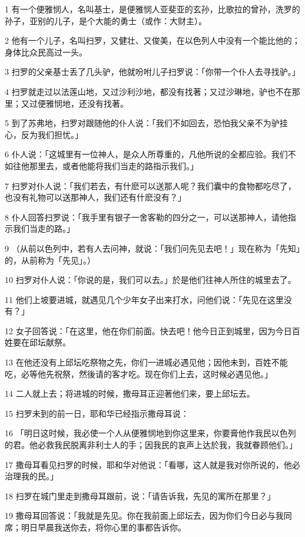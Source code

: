\par 1 有一个便雅悯人，名叫基士，是便雅悯人亚斐亚的玄孙，比歌拉的曾孙，洗罗的孙子，亚别的儿子，是个大能的勇士（或作：大财主）。
\par 2 他有一个儿子，名叫扫罗，又健壮、又俊美，在以色列人中没有一个能比他的；身体比众民高过一头。
\par 3 扫罗的父亲基士丢了几头驴，他就吩咐儿子扫罗说：「你带一个仆人去寻找驴。」
\par 4 扫罗就走过以法莲山地，又过沙利沙地，都没有找著；又过沙琳地，驴也不在那里；又过便雅悯地，还没有找著。
\par 5 到了苏弗地，扫罗对跟随他的仆人说：「我们不如回去，恐怕我父亲不为驴挂心，反为我们担忧。」
\par 6 仆人说：「这城里有一位神人，是众人所尊重的，凡他所说的全都应验。我们不如往他那里去，或者他能将我们当走的路指示我们。」
\par 7 扫罗对仆人说：「我们若去，有什麽可以送那人呢？我们囊中的食物都吃尽了，也没有礼物可以送那神人，我们还有什麽没有？」
\par 8 仆人回答扫罗说：「我手里有银子一舍客勒的四分之一，可以送那神人，请他指示我们当走的路。」
\par 9 （从前以色列中，若有人去问神，就说：「我们问先见去吧！」现在称为「先知」的，从前称为「先见」。）
\par 10 扫罗对仆人说：「你说的是，我们可以去。」於是他们往神人所住的城里去了。
\par 11 他们上坡要进城，就遇见几个少年女子出来打水，问他们说：「先见在这里没有？」
\par 12 女子回答说：「在这里，他在你们前面。快去吧！他今日正到城里，因为今日百姓要在邱坛献祭。
\par 13 在他还没有上邱坛吃祭物之先，你们一进城必遇见他；因他未到，百姓不能吃，必等他先祝祭，然後请的客才吃。现在你们上去，这时候必遇见他。」
\par 14 二人就上去；将进城的时候，撒母耳正迎著他们来，要上邱坛去。
\par 15 扫罗未到的前一日，耶和华已经指示撒母耳说：
\par 16 「明日这时候，我必使一个人从便雅悯地到你这里来，你要膏他作我民以色列的君。他必救我民脱离非利士人的手；因我民的哀声上达於我，我就眷顾他们。」
\par 17 撒母耳看见扫罗的时候，耶和华对他说：「看哪，这人就是我对你所说的，他必治理我的民。」
\par 18 扫罗在城门里走到撒母耳跟前，说：「请告诉我，先见的寓所在那里？」
\par 19 撒母耳回答说：「我就是先见。你在我前面上邱坛去，因为你们今日必与我同席；明日早晨我送你去，将你心里的事都告诉你。
